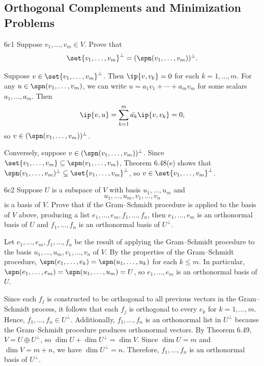 \subsection{Orthogonal Complements and Minimization Problems}

\begin{exercise}{6c1}
    Suppose $v_1, \ldots, v_m \in V$.
    Prove that
    \[
        \set{v_1, \ldots, v_m}^\perp = (\spn(v_1, \ldots, v_m))^\perp.
    \]
\end{exercise}

\begin{sol}
    Suppose $v \in \set{v_1, \ldots, v_m}^\perp$.
    Then $\ip{v, v_k} = 0$ for each $k = 1, \ldots, m$.
    For any $u \in \spn(v_1, \ldots, v_m)$, we can write $u = a_1 v_1 + \cdots + a_m v_m$ for some scalars $a_1, \ldots, a_m$.
    Then
    \[
        \ip{v, u} = \sum_{k=1}^{m} \bar{a_k} \ip{v, v_k} = 0,
    \]
    so $v \in (\spn(v_1, \ldots, v_m))^\perp$.

    Conversely, suppose $v \in (\spn(v_1, \ldots, v_m))^\perp$.
    Since $\set{v_1, \ldots, v_m} \subseteq \spn(v_1, \ldots, v_m)$, Theorem 6.48(e) shows that $\spn(v_1, \ldots, v_m)^\perp \subseteq \set{v_1, \ldots, v_m}^\perp$, so $v \in \set{v_1, \ldots, v_m}^\perp$.
\end{sol}

\begin{exercise}{6c2}
    Suppose $U$ is a subspace of $V$ with basis $u_1, \ldots, u_m$ and
    \[
        u_1, \ldots, u_m, v_1, \ldots, v_n
    \]
    is a basis of $V$.
    Prove that if the Gram--Schmidt procedure is applied to the basis of $V$ above, producing a list $e_1, \ldots, e_m, f_1, \ldots, f_n$, then $e_1, \ldots, e_m$ is an orthonormal basis of $U$ and $f_1, \ldots, f_n$ is an orthonormal basis of $U^\perp$.
\end{exercise}

\begin{sol}
    Let $e_1, \ldots, e_m, f_1, \ldots, f_n$ be the result of applying the Gram--Schmidt procedure to the basis $u_1, \ldots, u_m, v_1, \ldots, v_n$ of $V$.
    By the properties of the Gram--Schmidt procedure, $\spn(e_1, \ldots, e_k) = \spn(u_1, \ldots, u_k)$ for each $k \leq m$.
    In particular, $\spn(e_1, \ldots, e_m) = \spn(u_1, \ldots, u_m) = U$, so $e_1, \ldots, e_m$ is an orthonormal basis of $U$.

    Since each $f_j$ is constructed to be orthogonal to all previous vectors in the Gram--Schmidt process, it follows that each $f_j$ is orthogonal to every $e_k$ for $k = 1, \ldots, m$.
    Hence, $f_1, \ldots, f_n \in U^\perp$.
    Additionally, $f_1, \ldots, f_n$ is an orthonormal list in $U^\perp$ because the Gram--Schmidt procedure produces orthonormal vectors.
    By Theorem 6.49, $V = U \oplus U^\perp$, so $\dim U + \dim U^\perp = \dim V$.
    Since $\dim U = m$ and $\dim V = m + n$, we have $\dim U^\perp = n$.
    Therefore, $f_1, \ldots, f_n$ is an orthonormal basis of $U^\perp$.
\end{sol}

